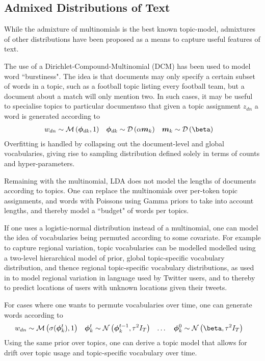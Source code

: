 

\subsection{Admixed Distributions of Text}

While the admixture of multinomials is the best known topic-model, admixtures of other distributions have been proposed as a means to capture useful features of text. 

The use of a Dirichlet-Compound-Multinomial (DCM) has been used to model word ``burstiness"\cite{Madsen2005}. The idea is that documents may only specify a certain subset of words in a topic, such as a football topic listing every football team, but a document about a match will only mention two. In such cases, it may be useful to specialise topics to particular documentsso  that given a topic assignment $z_{dn}$ a word is generated according to
\begin{align}
w_{dn} & \sim \muln{\vv{\phi}_{dk}}{1} &
\vv{\phi}_{dk} & \sim \dir{\alpha \vv{m}_k} &
\vv{m}_k & \sim \dir{\vv{\beta}}
\end{align}
Overfitting is handled by collapsing out the document-level and global vocabularies, giving rise to sampling distribution defined solely in terms of counts and hyper-parameters. 

Remaining with the multinomial, LDA does not model the lengths of documents according to topics. One can replace the multinomials over per-token topic assignments, and words with Poissons using Gamma priors to take into account lengths, and thereby model a ``budget" of words per topics\cite{Gopalan2013}. 

If one uses a logistic-normal distribution instead of a multinomial, one can model the idea of vocabularies being permuted according to some covariate. For example to capture regional variation, topic vocabularies can be modelled modelled using a two-level hierarchical model of prior, global topic-specific vocabulary distribution, and thence regional topic-specific vocabulary distributions, as used in \cite{Eisenstein2010} to model regional variation in language used by Twitter users, and to thereby to predict locations of users with unknown locations given their tweets.

For cases where one wants to permute vocabularies over time, one can generate words according to
\begin{align}
w_{dn} & \sim \muln{\sigma(\vv{\phi}_k^t)}{1} &
\vv{\phi}_k^t & \sim \nor{\vv{\phi}_k^{t-1}}{\tau^2 I_T} & \ldots\quad
\vv{\phi}_k^0 & \sim \nor{\vv{\beta}}{\tau^2 I_T}
\end{align}
Using the same prior over topics, one can derive a topic model that allows for drift over topic usage and topic-specific vocabulary over time\cite{Blei2006a}. 

